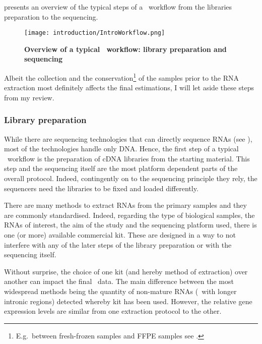  presents an overview of the typical steps of a
\Rnaseq\ workflow from the libraries preparation to the sequencing.

\begin{figure}
    \texttt{[image: introduction/IntroWorkflow.png]}\centering
    \caption[Overview of a \Rnaseq\ workflow: library preparation
    and sequencing]{\label{fig:OverviewRnaseqPrepSeq}\textbf{Overview of
    a typical \Rnaseq\ workflow:
    library preparation and sequencing}}
\end{figure}

\NB Albeit the collection and the conservation\footnote{E.g.\ between fresh-frozen
samples and \gls{FFPE} samples see \cite{sampleConservationMatters}.}
of the samples prior to the
\gls{RNA} extraction most definitely affects the final estimations,
I will let aside these steps from my review.

\subsubsection{Library preparation}

While there are sequencing technologies that can directly sequence \glspl{RNA}
(see ), most of the technologies handle only \gls{DNA}.
Hence, the first step of a typical \Rnaseq\ workflow is the preparation of
\gls{cDNA} libraries from the starting material. This step and the sequencing
itself are the most platform dependent parts of the overall protocol.
Indeed, contingently on to the sequencing principle they rely,
the sequencers need the libraries to be fixed and loaded differently.

There are many methods to extract \glspl{RNA} from the primary samples and they
are commonly standardised. Indeed, regarding the type of biological samples,
the \glspl{RNA} of interest, the aim of the  study and the sequencing platform
used, there is one (or more) available commercial kit. These are designed in
a way to not interfere
with any of the later steps of the library preparation or with the sequencing
itself.

Without surprise, the choice of one kit (and hereby method of extraction)
over another can impact the final \Rnaseq\ data. The main difference between
the most widespread methods being the quantity of non-mature \glspl{RNA}
(\ie\ with longer intronic regions) detected whereby kit has been used.
However, the relative gene expression levels are similar from one extraction
protocol to the other. 


